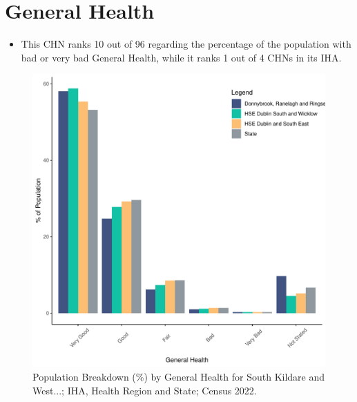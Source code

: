 \documentclass{article}
\begin{document}
\pagebreak

\section{General Health}\label{sect:GenHealth}
\begin{itemize}
\item  This CHN ranks  10 out of 96 regarding the percentage of the population with bad or very bad General Health, while it ranks   1 out of 4 CHNs in its IHA.
\end{itemize}
\begin{figure}[h]
	\centering
	\includegraphics[width = 150mm]{../figures/GenED.pdf}
	\caption{Population Breakdown (\%) by General Health for South Kildare and West...; IHA, Health Region and State;  Census 2022.}
	\label{fig:2ae19629-1a6a-13a3-e055-000000000001}
	\end{figure}
\end{document}
